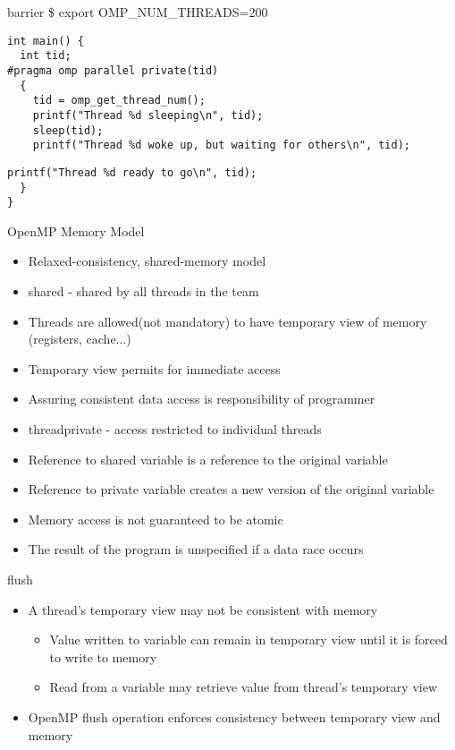 \documentclass[10pt]{beamer}
\begin{document}
\begin{frame}[fragile]{barrier}
\$ export OMP\_NUM\_THREADS=200
\begin{Verbatim}[fontsize=\small, formatcom=\color{red}]
int main() {
  int tid;
#pragma omp parallel private(tid)
  {
    tid = omp_get_thread_num();
    printf("Thread %d sleeping\n", tid);
    sleep(tid);
    printf("Thread %d woke up, but waiting for others\n", tid);
\end{Verbatim}
\begin{Verbatim}[fontsize=\small, formatcom=\color{red}]
    printf("Thread %d ready to go\n", tid);
  }
}
\end{Verbatim}
\end{frame}

\begin{frame}{OpenMP Memory Model}
\begin{itemize}
\item Relaxed-consistency, shared-memory model
\item shared - shared by all threads in the team
\item Threads are allowed(not mandatory) to have temporary view of memory
(registers, cache...)
\item Temporary view permits for immediate access
\item Assuring consistent data access is responsibility of programmer
\item threadprivate - access restricted to individual threads
\item Reference to shared variable is a reference to the original variable
\item Reference to private variable creates a new version of the original
variable
\item Memory access is not guaranteed to be atomic
\item The result of the program is unspecified if a data race occurs
\end{itemize}
\end{frame}

\begin{frame}{flush}
\begin{itemize}
\item A thread's temporary view may not be consistent with memory
\begin{itemize}
  \item Value written to variable can remain in temporary view until it is
        forced to write to memory
  \item Read from a variable may retrieve value from thread's temporary view
\end{itemize}
\item OpenMP flush operation enforces consistency between temporary view and
memory
\end{itemize}
\end{frame}
\end{document}
